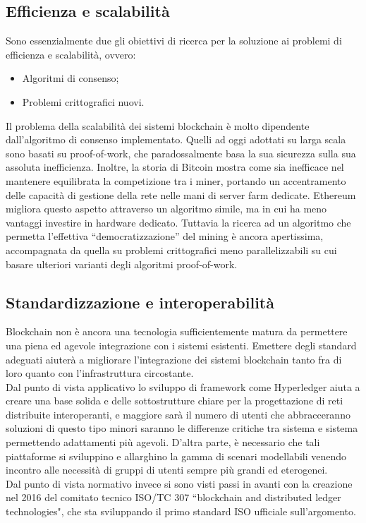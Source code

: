     \subsection{Efficienza e scalabilità}
        Sono essenzialmente due gli obiettivi di ricerca per la soluzione ai problemi di efficienza e scalabilità, ovvero:
        \begin{itemize}
            \item Algoritmi di consenso;
            \item Problemi crittografici nuovi.
        \end{itemize}
        Il problema della scalabilità dei sistemi blockchain è molto dipendente dall'algoritmo di consenso implementato. Quelli ad oggi adottati su larga scala sono basati su proof-of-work, che paradossalmente basa la sua sicurezza sulla sua assoluta inefficienza. Inoltre, la storia di Bitcoin mostra come sia inefficace nel mantenere equilibrata la competizione tra i miner, portando un accentramento delle capacità di gestione della rete nelle mani di server farm dedicate. Ethereum migliora questo aspetto attraverso un algoritmo simile, ma in cui ha meno vantaggi investire in hardware dedicato. Tuttavia la ricerca ad un algoritmo che permetta l'effettiva ``democratizzazione'' del mining è ancora apertissima, accompagnata da quella su problemi crittografici meno parallelizzabili su cui basare ulteriori varianti degli algoritmi proof-of-work.
        
    \subsection{Standardizzazione e interoperabilità}
        Blockchain non è ancora una tecnologia sufficientemente matura da permettere una piena ed agevole integrazione con i sistemi esistenti. Emettere degli standard adeguati aiuterà a migliorare l'integrazione dei sistemi blockchain tanto fra di loro quanto con l'infrastruttura circostante. \\
        Dal punto di vista applicativo lo sviluppo di framework come Hyperledger aiuta a creare una base solida e delle sottostrutture chiare per la progettazione di reti distribuite interoperanti, e maggiore sarà il numero di utenti che abbracceranno soluzioni di questo tipo minori saranno le differenze critiche tra sistema e sistema permettendo adattamenti più agevoli. D'altra parte, è necessario che tali piattaforme si sviluppino e allarghino la gamma di scenari modellabili venendo incontro alle necessità di gruppi di utenti sempre più grandi ed eterogenei. \\
        Dal punto di vista normativo invece si sono visti passi in avanti con la creazione nel 2016 del comitato tecnico ISO/TC 307 ``blockchain and distributed ledger technologies", che sta sviluppando il primo standard ISO ufficiale sull'argomento.

